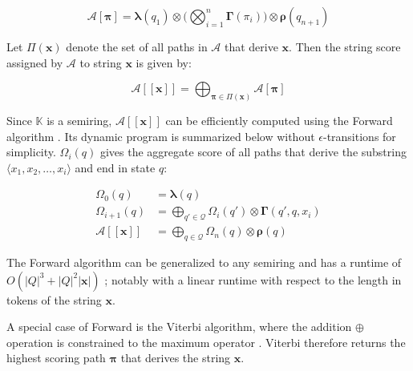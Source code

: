 \begin{equation}
  \mathcal{A}[\bm{\pi}] = \bm{\lambda}(q_1) \otimes \Bigg( \bigotimes_{i=1}^n \bm{\Gamma}(\pi_i) \Bigg) \otimes \bm{\rho}(q_{n+1})
\end{equation}

\begin{definition}
  \label{def:string_score}
  Let $\Pi(\bm{x})$ denote the set of all paths in $\mathcal{A}$ that derive
  $\bm{x}$. Then the string score assigned by $\mathcal{A}$ to string $\bm{x}$
  is given by:
  
\end{definition}

\begin{equation}
  \mathcal{A}[\![\bm{x}]\!] = \bigoplus_{\bm{\pi} \in \Pi(\bm{x})} \mathcal{A}[\bm{\pi}]
\end{equation}

\begin{remark}
  Since $\mathbb{K}$ is a semiring, $\mathcal{A}[\![\bm{x}]\!]$ can be
  efficiently computed using the Forward algorithm \citep{baum1966statistical}.
  Its dynamic program is summarized below without $\epsilon$-transitions for
  simplicity. $\Omega_i(q)$ gives the aggregate score of all paths that derive
  the substring $\langle x_1, x_2, \dots, x_i \rangle$ and end in state $q$:
 
  \begin{subequations}
    \begin{align}
      \Omega_0(q) &= \bm{\lambda}(q) \\
      \Omega_{i+1}(q) &= \bigoplus_{q' \in \mathcal{Q}} \Omega_i(q') \otimes \bm{\Gamma}(q',q,x_i)  \\
      \mathcal{A}[\![\bm{x}]\!] &= \bigoplus_{q \in \mathcal{Q}} \Omega_n(q) \otimes \bm{\rho}(q)
    \end{align}
  \end{subequations}

\end{remark}

\begin{remark}
  \label{rmk:old_runtime}
  The Forward algorithm can be generalized to any semiring
  \citep{eisner2002parameter} and has a runtime of $O(|Q|^3 + |Q|^2|\bm{x}|)$
  \citep{schwartz2018sopa}; notably with a linear runtime with respect to the
  length in tokens of the string $\bm{x}$.
\end{remark}

\begin{remark}
  A special case of Forward is the Viterbi algorithm, where the addition
  $\oplus$ operation is constrained to the maximum operator
  \citep{viterbi1967error}. Viterbi therefore returns the highest scoring path
  $\bm{\pi}$ that derives the string $\bm{x}$.
\end{remark}

